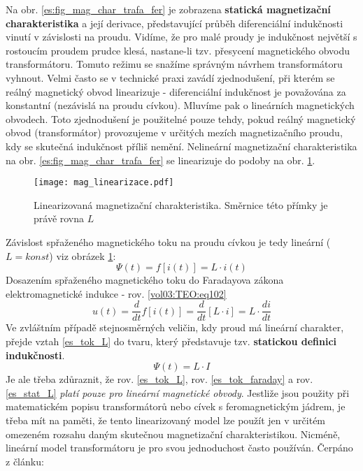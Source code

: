     Na obr. \ref{es:fig_mag_char_trafa_fer} je zobrazena \textbf{statická magnetizační 
    charakteristika} a její derivace, představující průběh diferenciální indukčnosti vinutí v 
    závislosti na proudu. Vidíme, že pro malé proudy je indukčnost největší s rostoucím proudem 
    prudce klesá, nastane-li tzv. přesycení magnetického obvodu transformátoru. Tomuto režimu se 
    snažíme správným návrhem transformátoru vyhnout. Velmi často se v technické praxi zavádí 
    zjednodušení, při kterém se reálný magnetický obvod linearizuje - diferenciální indukčnost je 
    považována za konstantní (nezávislá na proudu cívkou). Mluvíme pak o lineárních magnetických 
    obvodech. Toto zjednodušení je použitelné pouze tehdy, pokud reálný magnetický obvod 
    (transformátor) provozujeme v určitých mezích magnetizačního proudu, kdy se skutečná indukčnost
    příliš nemění. Nelineární magnetizační charakteristika na obr. \ref{es:fig_mag_char_trafa_fer} 
    se linearizuje do podoby na obr. \ref{figure:mag_lin}.

    \begin{figure}[ht!]   %
      \centering
      \texttt{[image: mag\_linearizace.pdf]}
      \caption{Linearizovaná magnetizační charakteristika. Směrnice této přímky je právě rovna $L$}
      \label{figure:mag_lin}
    \end{figure}
    Závislost spřaženého magnetického toku na proudu cívkou je tedy lineární ($L=konst$) viz obrázek
    \ref{figure:mag_lin}:
    \begin{equation}\label{es_tok_L}
      \Psi(t)=f[i(t)] = L \cdot i(t)
    \end{equation}    
    Dosazením spřaženého magnetického toku do Faradayova zákona elektromagnetické indukce - rov.
    \ref{vol03:TEO:eq102}
    \begin{equation}\label{es_tok_faraday}
        u(t)=\frac{d}{dt}f[i(t)]=\frac{d}{dt}[L\cdot i]=L\cdot\frac{di}{dt}
    \end{equation}
    Ve zvláštním případě stejnosměrných veličin, kdy proud má lineární charakter, přejde vztah
    \ref{es_tok_L} do tvaru, který představuje tzv. \textbf{statickou definici indukčnosti}.
    \begin{equation}\label{es_stat_L}
      \Psi(t)= L \cdot I
    \end{equation}
    Je ale třeba zdůraznit, že rov. \ref{es_tok_L}, rov. \ref{es_tok_faraday} a rov. 
    \ref{es_stat_L} \emph{platí pouze pro lineární magnetické obvody}. Jestliže jsou použity při 
    matematickém popisu transformátorů nebo cívek s feromagnetickým jádrem, je třeba mít na paměti, 
    že tento linearizovaný model lze použít jen v určitém omezeném rozsahu daným skutečnou 
    magnetizační charakteristikou. Nicméně, lineární model transformátoru je pro svou jednoduchost 
    často používán. Čerpáno z článku: \librarianTrafoModel
    
